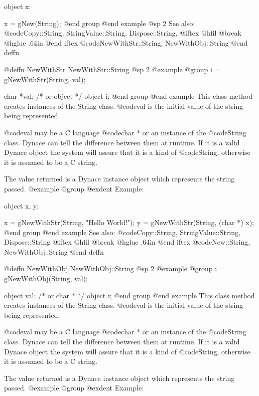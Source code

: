 object  x;

x = gNew(String);
@end group
@end example
@sp 2
See also:  @code{Copy::String, StringValue::String, Dispose::String,}
@iftex
@hfil @break @hglue .64in      
@end iftex
@code{NewWithStr::String, NewWithObj::String}
@end deffn








@deffn {NewWithStr} NewWithStr::String
@sp 2
@example
@group
i = gNewWithStr(String, val);

char *val;  /*  or object  */
object  i;
@end group
@end example
This class method creates instances of the String class.  @code{val}
is the initial value of the string being represented.  

@code{val} may be a C language @code{char *} or an instance of the
@code{String} class.  Dynace can tell the difference between them at
runtime.  If it is a valid Dynace object the system will assure that it is
a kind of @code{String}, otherwise it is assumed to be a C string.

The value returned is a Dynace instance object which represents the string
passed.
@example
@group
@exdent Example:

object  x, y;

x = gNewWithStr(String, "Hello World!");
y = gNewWithStr(String, (char *) x);
@end group
@end example
See also:  @code{Copy::String, StringValue::String, Dispose::String}
@iftex
@hfil @break @hglue .64in     
@end iftex
@code{New::String, NewWithObj::String}
@end deffn












@deffn {NewWithObj} NewWithObj::String
@sp 2
@example
@group
i = gNewWithObj(String, val);

object  val;  /*  or char *  */
object  i;
@end group
@end example
This class method creates instances of the String class.  @code{val}
is the initial value of the string being represented.  

@code{val} may be a C language @code{char *} or an instance of the
@code{String} class.  Dynace can tell the difference between them at
runtime.  If it is a valid Dynace object the system will assure that it is
a kind of @code{String}, otherwise it is assumed to be a C string.

The value returned is a Dynace instance object which represents the string
passed.
@example
@group
@exdent Example:

